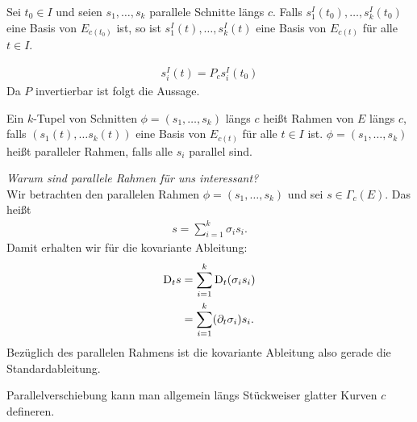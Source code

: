 \begin{lem}
\label{lem:BasisVB}
Sei $t_0 \in I$ und seien $s_1, \dots, s_k$ parallele Schnitte längs $c$.
Falls $s^I_1 (t_0), \dots, s^I_k (t_0)$ eine Basis von $E_{c(t_0)}$ ist, so ist $s^I_1 (t), \dots, s^I_k (t)$ eine Basis von $E_{c(t)}$ für alle $t \in I$.
\end{lem}
\begin{bew}
\begin{align}
s^I_i (t) = P_c s^I_i (t_0)
\end{align}
Da $P$ invertierbar ist folgt die Aussage.%
\end{bew}
\begin{defs}
Ein $k$-Tupel von Schnitten $\phi = (s_1, \dots, s_k)$ längs $c$ heißt Rahmen von $E$ längs $c$, falls $(s_1(t), \dots s_k(t))$ eine Basis von $E_{c(t)}$ für alle $t \in I$ ist.
$\phi = (s_1, \dots, s_k)$ heißt paralleler Rahmen, falls alle $s_i$ parallel sind.
\end{defs}
\textit{Warum sind parallele Rahmen für uns interessant?}\\
Wir betrachten den parallelen Rahmen $\phi = (s_1, \dots, s_k)$ und sei $s \in \Gamma_c (E)$.
Das heißt 
\begin{align}
s= \sum^{k}_{i=1} \sigma_i s_i.
\end{align}
Damit erhalten wir für die kovariante Ableitung:
\begin{align}
\mathrm{D}_t s &= \sum^{k}_{i=1} \mathrm{D}_t (\sigma_i s_i)\\
&= \sum^{k}_{i=1} (\partial_t \sigma_i) s_i. 
\end{align}
Bezüglich des parallelen Rahmens ist die kovariante Ableitung also gerade die Standardableitung.
\begin{bem}
Parallelverschiebung kann man allgemein längs Stückweiser glatter Kurven $c$ defineren.
\end{bem}


